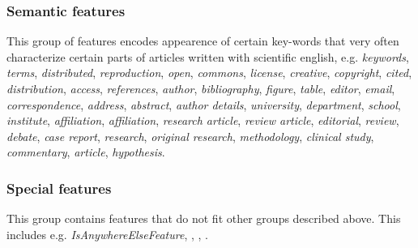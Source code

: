 \subsubsection{Semantic features}
This group of features encodes appearence of certain key-words that very often characterize certain parts of articles written with scientific english, e.g. \textit{keywords}, \textit{terms}, \textit{distributed}, \textit{reproduction}, \textit{open}, \textit{commons}, \textit{license}, \textit{creative}, \textit{copyright}, \textit{cited}, \textit{distribution}, \textit{access}, \textit{references}, \textit{author}, \textit{bibliography}, \textit{figure}, \textit{table}, \textit{editor}, \textit{email}, \textit{correspondence}, \textit{address}, \textit{abstract}, \textit{author details}, \textit{university}, \textit{department}, \textit{school}, \textit{institute}, \textit{affiliation}, \textit{affiliation}, \textit{research article}, \textit{review article}, \textit{editorial}, \textit{review}, \textit{debate}, \textit{case report}, \textit{research}, \textit{original research}, \textit{methodology}, \textit{clinical study}, \textit{commentary}, \textit{article}, 
 \textit{hypothesis}.

\subsubsection{Special features}
This group contains features that do not fit other groups described above. This includes e.g. \textit{IsAnywhereElseFeature}, , , .